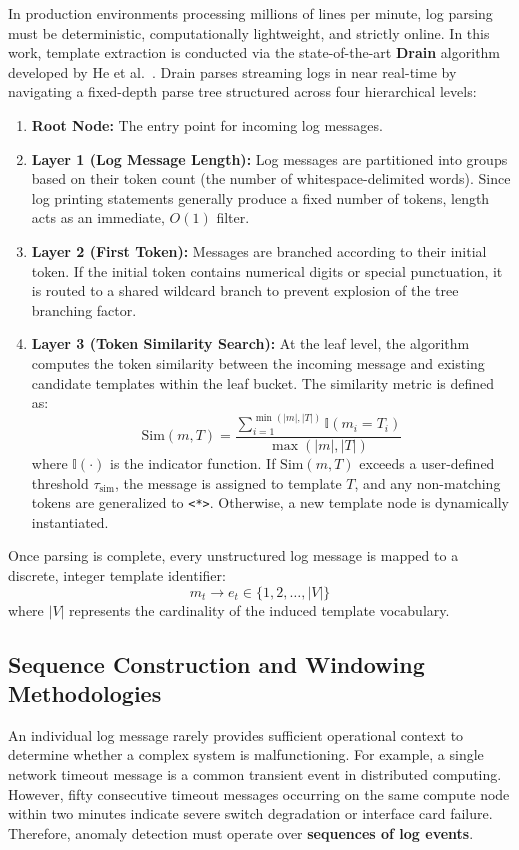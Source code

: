 In production environments processing millions of lines per minute, log parsing must be deterministic, computationally lightweight, and strictly online. In this work, template extraction is conducted via the state-of-the-art \textbf{Drain} algorithm developed by He et al.~\cite{he2017drain}. Drain parses streaming logs in near real-time by navigating a fixed-depth parse tree structured across four hierarchical levels:
\begin{enumerate}
    \item \textbf{Root Node:} The entry point for incoming log messages.
    \item \textbf{Layer 1 (Log Message Length):} Log messages are partitioned into groups based on their token count (the number of whitespace-delimited words). Since log printing statements generally produce a fixed number of tokens, length acts as an immediate, $O(1)$ filter.
    \item \textbf{Layer 2 (First Token):} Messages are branched according to their initial token. If the initial token contains numerical digits or special punctuation, it is routed to a shared wildcard branch to prevent explosion of the tree branching factor.
    \item \textbf{Layer 3 (Token Similarity Search):} At the leaf level, the algorithm computes the token similarity between the incoming message and existing candidate templates within the leaf bucket. The similarity metric is defined as:
    \begin{equation}
        \text{Sim}(m, T) = \frac{\sum_{i=1}^{\min(|m|, |T|)} \mathbb{I}(m_i = T_i)}{\max(|m|, |T|)}
    \end{equation}
    where $\mathbb{I}(\cdot)$ is the indicator function. If $\text{Sim}(m, T)$ exceeds a user-defined threshold $\tau_{\text{sim}}$, the message is assigned to template $T$, and any non-matching tokens are generalized to \texttt{<*>}. Otherwise, a new template node is dynamically instantiated.
\end{enumerate}

Once parsing is complete, every unstructured log message is mapped to a discrete, integer template identifier:
\begin{equation}
    m_t \longrightarrow e_t \in \{1, 2, \dots, |V|\}
\end{equation}
where $|V|$ represents the cardinality of the induced template vocabulary.

\subsection{Sequence Construction and Windowing Methodologies}
\label{subsec:windowing_methodologies}
An individual log message rarely provides sufficient operational context to determine whether a complex system is malfunctioning. For example, a single network timeout message is a common transient event in distributed computing. However, fifty consecutive timeout messages occurring on the same compute node within two minutes indicate severe switch degradation or interface card failure. Therefore, anomaly detection must operate over \textbf{sequences of log events}.

